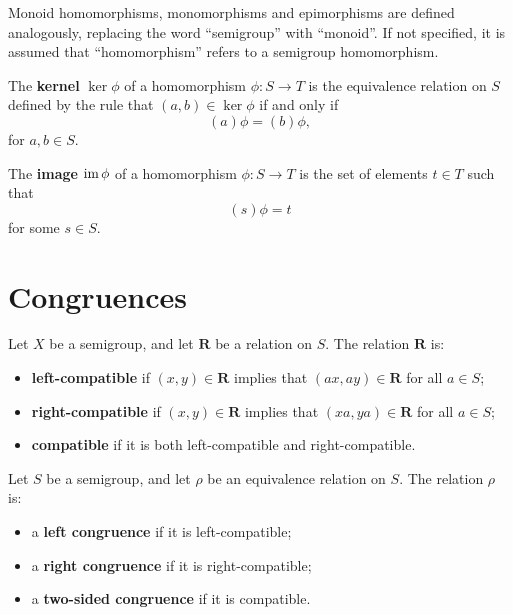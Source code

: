 Monoid homomorphisms, monomorphisms and epimorphisms are defined analogously,
replacing the word ``semigroup'' with ``monoid''.  If not specified, it is
assumed that ``homomorphism'' refers to a semigroup homomorphism.

\begin{definition}
  \label{def:kernel}
  The \textbf{kernel} $\ker\phi$ of a homomorphism $\phi:S \to T$ is the
  equivalence relation on $S$ defined by the rule that $(a,b) \in \ker\phi$ if
  and only if
  $$(a)\phi = (b)\phi,$$
  for $a, b \in S$.
\end{definition}

\begin{definition}
  \label{def:image}
  The \textbf{image} $\operatorname{im}\phi$ of a homomorphism $\phi:S \to T$ is the set of
  elements $t \in T$ such that
  $$(s)\phi = t$$
  for some $s \in S$.
\end{definition}

\section{Congruences}
\label{sec:intro-congs}

\begin{definition}
  \label{def:compatible}
  Let $X$ be a semigroup, and let $\mathbf{R}$ be a relation on $S$.  The
  relation $\mathbf{R}$ is:
  \begin{itemize}
  \item \textbf{left-compatible} if $(x, y) \in \mathbf{R}$ implies that
    $(ax, ay) \in \mathbf{R}$ for all $a \in S$;
  \item \textbf{right-compatible} if $(x, y) \in \mathbf{R}$ implies that
    $(xa, ya) \in \mathbf{R}$ for all $a \in S$;
  \item \textbf{compatible} if it is both left-compatible and
    right-compatible.
  \end{itemize}
\end{definition}

\begin{definition}
  \label{def:congruence}
  Let $S$ be a semigroup, and let $\rho$ be an equivalence relation on $S$.  The
  relation $\rho$ is:
  \begin{itemize}
  \item a \textbf{left congruence} if it is left-compatible;
  \item a \textbf{right congruence} if it is right-compatible;
  \item a \textbf{two-sided congruence} if it is compatible.
  \end{itemize}
\end{definition}

